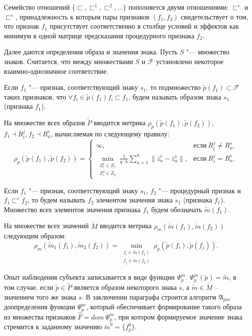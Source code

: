 Семейство отношений $\{\sqsubset,\sqsubset^1,\sqsubset^2,\dots\}$ пополняется двумя отношениями: $\sqsubset^c$ и $\sqsubset^e$, принадлежность к которым пары признаков $(f_1,f_2)$ свидетельствует о том, что признак $f_1$ присутствует соответственно в столбце условий и эффектов как минимум в одной матрице предсказания процедурного признака $f_2$.

Далее даются определения образа и значения знака. Пусть $S$ "--- множество знаков. Считается, что между множествами $S$ и $\mathcal F$ установлено некоторое взаимно-однозначное соответствие.

\begin{Def}
	Если $f_1$ "--- признак, соответствующий знаку $s_1$, то подмножество $\tilde p(f_1)\subset\mathcal F$ таких признаков, что $\forall f_i\in\tilde p(f_1) f_i\sqsubset f_1$, будем называть образом знака $s_1$ (признака $f_1$).
\end{Def}

На множестве всех образов $\tilde P$ вводится метрика $\rho_p(\tilde p(f_1),\tilde p(f_2))$, $f_1\dashv R_i^j, f_2\dashv R_u^s$, вычисляемая по следующему правилу:
\[
\rho_p(\tilde p(f_1),\tilde p(f_2))=
\begin{cases}
\infty, & \text{если}\ R_i^j\not=R_u^s,\\
\min\limits_{\substack{Z_r^1\in Z_1\\Z_s^2\in Z_2}}\frac{1}{q\cdot h}\sum\limits_{u=1}^h\|\bar z_u^r-\bar z_u^s\|, & \text{если}\ R_i^j=R_u^s.
\end{cases}
\]

\begin{Def}
	Если $f_1$ "--- признак, соответствующий знаку $s_1$, $f_2$ "--- процедурный признак и $f_1\sqsubset^c f_2$, то будем называть $f_2$ элементом значения знака $s_1$ (признака $f_1$). Множество всех элементов значения признака $f_1$ будем обозначать $\tilde m(f_1)$.
\end{Def}

На множестве всех значений $\tilde M$ вводится метрика $\rho_m(\tilde m(f_1),\tilde m(f_2))$ следующим образом:
\[
\rho_m(\tilde m_1(f_1),\tilde m_2(f_2 ))=\min\limits_{\substack{f_i\in\tilde m(f_1 )\\f_j\in\tilde m(f_2 )}}\rho_p(\tilde p(f_i ),\tilde p(f_j )).
\]

Опыт наблюдения субъекта записывается в виде функции $\Psi_p^m$. $\Psi_p^m(\tilde p)=\tilde m$, в том случае, если $\tilde p\in\tilde P$ является образом некоторого знака $s$, а $\tilde m\in\tilde M$ -- значением того же знака $s$. В заключении параграфа строится алгоритм $\mathfrak A_{pm}$ доопределения функции $\Psi_p^m$, который обеспечивает формирование такого образа из множества признаков $\hat F=dom\ \Psi_p^m$, при котором формируемое значение знака стремится к заданному значению $\tilde m^0=\{f_p^0\}$.

